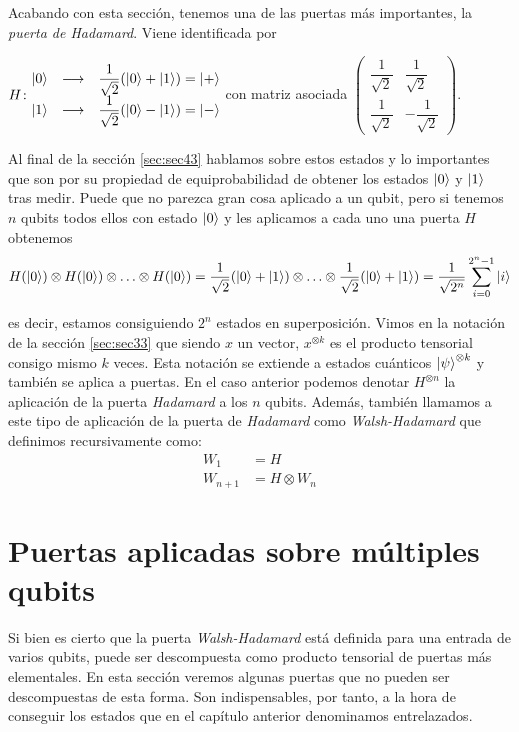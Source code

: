 Acabando con esta sección, tenemos una de las puertas más importantes, la \textit{puerta de Hadamard}. Viene identificada por

$H\colon \begin{matrix}\left|0\right\rangle&\longrightarrow& \dfrac{1}{\sqrt{2}}(\left|0\right\rangle+\left|1\right\rangle)=\left|+\right\rangle\\ \left|1\right\rangle&\longrightarrow& \dfrac{1}{\sqrt{2}}(\left|0\right\rangle-\left|1\right\rangle)=\left|-\right\rangle\end{matrix}$ con matriz asociada $\left(\begin{matrix}\dfrac{1}{\sqrt{2}}&\dfrac{1}{\sqrt{2}}\\ \dfrac{1}{\sqrt{2}}&-\dfrac{1}{\sqrt{2}}\end{matrix}\right)$.

Al final de la sección \ref{sec:sec43} hablamos sobre estos estados y lo importantes que son por su propiedad de equiprobabilidad de obtener los estados $\left|0\right\rangle$ y $\left|1\right\rangle$ tras medir. Puede que no parezca gran cosa aplicado a un qubit, pero si tenemos $n$ qubits todos ellos con estado $\left|0\right\rangle$ y les aplicamos a cada uno una puerta $H$ obtenemos
\begin{equation}
\label{eq:eq43}
H(\left|0\right\rangle)\otimes H(\left|0\right\rangle)\otimes\hdots\otimes H(\left|0\right\rangle)=\dfrac{1}{\sqrt{2}}(\left|0\right\rangle+\left|1\right\rangle)\otimes\hdots\otimes\dfrac{1}{\sqrt{2}}(\left|0\right\rangle+\left|1\right\rangle)=\dfrac{1}{\sqrt{2^n}}\sum_{i=0}^{2^n-1}\left|i\right\rangle
\end{equation}

es decir, estamos consiguiendo $2^n$ estados en superposición. Vimos en la notación de la sección \ref{sec:sec33} que siendo $x$ un vector, $x^{\otimes k}$ es el producto tensorial consigo mismo $k$ veces. Esta notación se extiende a estados cuánticos $\left|\psi\right\rangle^{\otimes k}$ y también se aplica a puertas. En el caso anterior podemos denotar $H^{\otimes n}$ la aplicación de la puerta \textit{Hadamard} a los $n$ qubits. Además, también llamamos a este tipo de aplicación de la puerta de \textit{Hadamard} como \textit{Walsh-Hadamard} que definimos recursivamente como:
\[ \begin{split} W_1&=H\\ W_{n+1}&=H\otimes W_n \end{split} \]

\section{Puertas aplicadas sobre múltiples qubits}

Si bien es cierto que la puerta \textit{Walsh-Hadamard} está definida para una entrada de varios qubits, puede ser descompuesta como producto tensorial de puertas más elementales. En esta sección veremos algunas puertas que no pueden ser descompuestas de esta forma. Son indispensables, por tanto, a la hora de conseguir los estados que en el capítulo anterior denominamos entrelazados.

